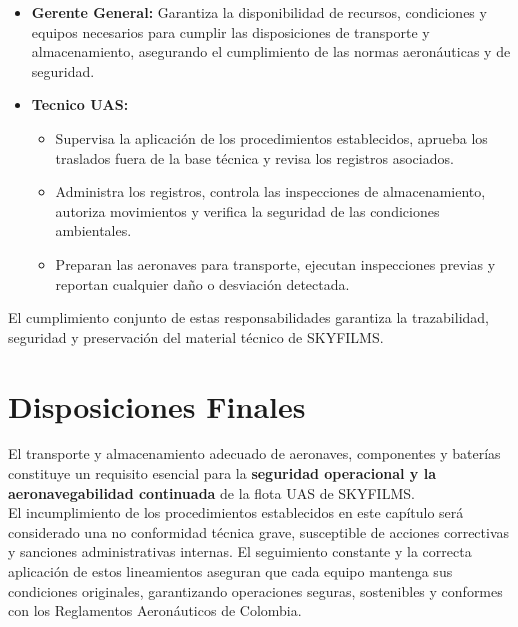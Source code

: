 \begin{itemize}
    \item \textbf{Gerente General:} Garantiza la disponibilidad de recursos, condiciones y equipos necesarios para cumplir las disposiciones de transporte y almacenamiento, asegurando el cumplimiento de las normas aeronáuticas y de seguridad.

    \item \textbf{Tecnico UAS:} 
    
    \begin{itemize}
        \item Supervisa la aplicación de los procedimientos establecidos, aprueba los traslados fuera de la base técnica y revisa los registros asociados.

        \item Administra los registros, controla las inspecciones de almacenamiento, autoriza movimientos y verifica la seguridad de las condiciones ambientales.

        \item Preparan las aeronaves para transporte, ejecutan inspecciones previas y reportan cualquier daño o desviación detectada.
    \end{itemize}


\end{itemize}

El cumplimiento conjunto de estas responsabilidades garantiza la trazabilidad, seguridad y preservación del material técnico de SKYFILMS.

\section{Disposiciones Finales}

El transporte y almacenamiento adecuado de aeronaves, componentes y baterías constituye un requisito esencial para la \textbf{seguridad operacional y la aeronavegabilidad continuada} de la flota UAS de SKYFILMS.\\

El incumplimiento de los procedimientos establecidos en este capítulo será considerado una no conformidad técnica grave, susceptible de acciones correctivas y sanciones administrativas internas. El seguimiento constante y la correcta aplicación de estos lineamientos aseguran que cada equipo mantenga sus condiciones originales, garantizando operaciones seguras, sostenibles y conformes con los Reglamentos Aeronáuticos de Colombia.